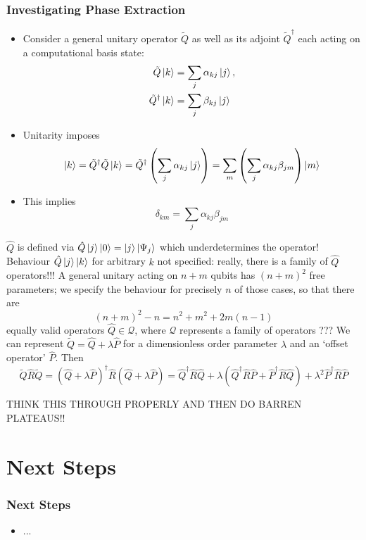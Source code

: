 \documentclass{beamer}
\begin{document}
\begin{frame}
\frametitle{Investigating Phase Extraction}
\begin{itemize}
\item Consider a general unitary operator $\tilde{Q}$ as well as its adjoint $\tilde{Q}^\dagger$ each acting on a computational basis state:
\begin{align}
\tilde{Q} \ket{k} &= \sum_j \alpha_{kj} \ket{j}, \\
\tilde{Q}^\dagger \ket{k} &= \sum_j \beta_{kj} \ket{j}
\end{align}
\item Unitarity imposes
\begin{equation}
\ket{k} = \tilde{Q}^\dagger \tilde{Q} \ket{k} = \tilde{Q}^\dagger \left( \sum_j \alpha_{kj} \ket{j} \right) = \sum_{m} \left(\sum_j \alpha_{kj} \beta_{jm} \right)  \ket{m}
\end{equation}
\item This implies 
\begin{equation}
\delta_{km}= \sum_j \alpha_{kj} \beta_{jm}
\end{equation}
\end{itemize}
\end{frame}

\begin{frame}
$\hat{Q}$ is defined via $\hat{Q}\ket{j}\ket{0} =\ket{j}\ket{\Psi_j}$ which \alert{underdetermines the operator}! Behaviour $\hat{Q} \ket{j} \ket{k}$ for arbitrary $k$ not specified: really, there is a family of $\hat{Q}$ operators!!! A general unitary acting on $n+m$ qubits has $(n+m)^2$ free parameters; we specify the behaviour for precisely $n$ of those cases, so that there are 
\begin{equation}
(n+m)^2 - n = n^2 + m^2 + 2m(n-1)
\end{equation}
equally valid operators $\hat{Q} \in \mathcal{Q}$, where $\mathcal{Q}$ represents a family of operators  ???
We can represent $\tilde{Q} = \hat{Q} + \lambda \hat{P}$ for a dimensionless order parameter $\lambda$ and an `offset operator' $\hat{P}$. Then 
\begin{equation}
\tilde{Q}\hat{R} \tilde{Q} = (\hat{Q} + \lambda \hat{P})^\dagger \hat{R} (\hat{Q} + \lambda \hat{P}) = \hat{Q}^\dagger \hat{R} \hat{Q} + \lambda \left( \hat{Q}^\dagger  \hat{R} \hat{P} + \hat{P}^\dagger \hat{R} \hat{Q}\right) + \lambda^2 \hat{P}^\dagger \hat{R} \hat{P}
\end{equation}
 
 
THINK THIS THROUGH PROPERLY AND THEN DO BARREN PLATEAUS!! 
 
\end{frame}

\section{Next Steps}

\begin{frame}
\frametitle{Next Steps}
\begin{itemize}
\item ...
\end{itemize}
\end{frame}
\end{document}
